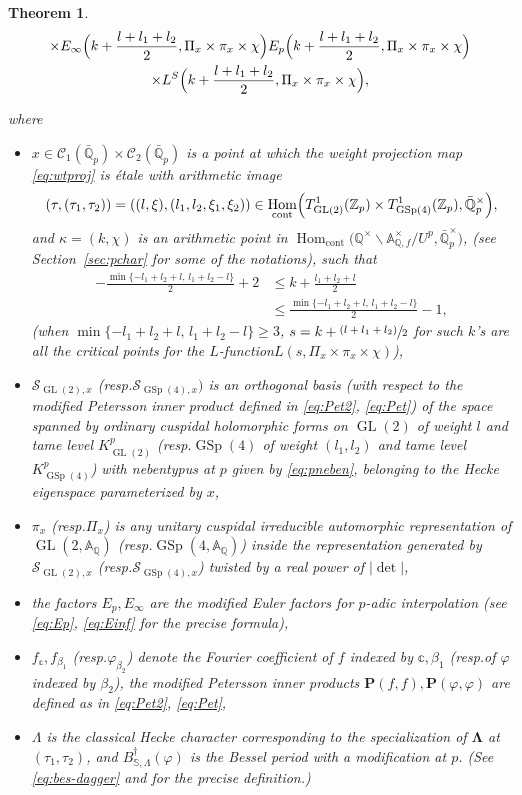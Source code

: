 \documentclass[10pt]{amsart}
\newcommand{\resp}{resp.}
\newcommand{\psfrac}[2]{\sfrac{(#1)}{#2}}
\newcommand{\Lfunction}{$L$\nobreakdash-func\-tion\xspace}
\theoremstyle{plain}
\newtheorem{thmintro}{Theorem}[section]
\theoremstyle{remark}
\newcommand{\bA}{\mathbb{A}}
\newcommand{\bQ}{\mathbb{Q}}
\newcommand{\bS}{\mathbb{S}}
\newcommand{\bZ}{\mathbb{Z}}
\newcommand{\bbc}{\mathbb{c}}
\newcommand{\sC}{\mathscr{C}}
\newcommand{\sS}{\mathscr{S}}
\newcommand{\bfP}{\mathbf{P}}
\DeclareMathOperator{\GL}{GL}
\DeclareMathOperator{\GSp}{GSp}
\newcommand{\cont}{\mathrm{cont}}
\DeclareMathOperator{\Hom}{Hom}
\let\bes B
\newcommand{\bLam}{\boldsymbol\Lambda}
\begin{document}
\begin{thmintro}
\begin{minipage}{\textwidth}
\begin{multline*}
\times E_\infty \Bigl(k+\frac{l+l_1+l_2}{2},\Pi_x\times\pi_x\times \chi\Bigr) E_p\Bigl(k+\frac{l+l_1+l_2}{2},\Pi_x\times\pi_x\times \chi\Bigr)\\
\times L^S\Bigl(k+\frac{l+l_1+l_2}{2},\Pi_x\times\pi_x\times \chi\Bigr),
\end{multline*}
\end{minipage}
\noindent
where
\begin{itemize}
\item
$x\in \sC_1(\bar{\bQ}_p)\times\sC_2(\bar{\bQ}_p)$ is a point at which the weight projection map \eqref{eq:wtproj} is \'{e}tale with arithmetic image
\[
(\tau,(\tau_1,\tau_2))=((l,\xi),(l_1,l_2,\xi_1,\xi_2))
\in \Hom_\cont\Bigl(T^1_{\GL(2)}(\bZ_p)\times T^1_{\GSp(4)}(\bZ_p),\bar{\bQ}^\times_p\Bigr),
\]
and $\kappa=(k,\chi)$ is an arithmetic point in $\Hom_\cont\bigl(\bQ^\times\backslash\bA^\times_{\bQ,f}/U^p,\bar{\bQ}^\times_p\bigr)$, (see Section~\ref{sec:pchar} for some of the notations), such that
\begin{equation}
\begin{aligned}\label{eq:kl}
-\frac{\min\{-l_1+l_2+l,\,l_1+l_2-l\}}{2}+2 &\leq k+\frac{l_1+l_2+l}{2}\\
&\leq \frac{\min\{-l_1+l_2+l,\,l_1+l_2-l\}}{2}-1,
\end{aligned}
\end{equation}
(when $\min\{-l_1+l_2+l,\,l_1+l_2-l\}\geq 3$, $s=k+\psfrac{l+l_1+l_2}{2}$ for such $k$'s are all the critical points for the \Lfunction $L(s,\Pi_x\times\pi_x\times\chi)$),
\item
$\sS_{\GL(2),x}$ (\resp $\sS_{\GSp(4),x})$ is an orthogonal basis (with respect to the modified \hbox{Petersson} inner product defined in \eqref{eq:Pet2}, \eqref{eq:Pet}) of the space spanned by ordinary cuspidal holomorphic forms on $\GL(2)$ of weight $l$ and tame level $K^p_{\GL(2)}$ (\resp $\GSp(4)$ of weight $(l_1,l_2)$ and tame level $K^p_{\GSp(4)}$) with nebentypus at $p$ given by \eqref{eq:pneben}, belonging to the Hecke eigenspace parameterized by $x$,
\item
$\pi_x$ (\resp $\Pi_x$) is any unitary cuspidal irreducible automorphic representation of $\GL(2,\bA_\bQ)$ (\resp $\GSp(4,\bA_\bQ)$) inside the representation generated by $\sS_{\GL(2),x}$ (\resp $\sS_{\GSp(4),x}$) twisted by a real power of $|\det|$,
\item
the factors $E_p,E_\infty$ are the modified Euler factors for $p$-adic interpolation (see \eqref{eq:Ep}, \eqref{eq:Einf} for the precise formula),
\item
$f_\bbc,f_{\beta_1}$ (\resp $\varphi_{\beta_2}$) denote the Fourier coefficient of $f$ indexed by $\bbc,\beta_1$ (\resp of $\varphi$ indexed by $\beta_2$), the modified Petersson inner products $\bfP(f,f),\bfP(\varphi,\varphi)$ are defined as in \eqref{eq:Pet2}, \eqref{eq:Pet},
\item
$\Lambda$ is the classical Hecke character corresponding to the specialization of $\bLam$ at $(\tau_1,\tau_2)$, and $\bes^\dagger_{\bS,\Lambda}(\varphi)$ is the Bessel period with a modification at $p$. (See \eqref{eq:bes-dagger} and \cite[\S2.2.1]{pFL} for the precise definition.)
\end{itemize}
\end{thmintro}
\end{document}
